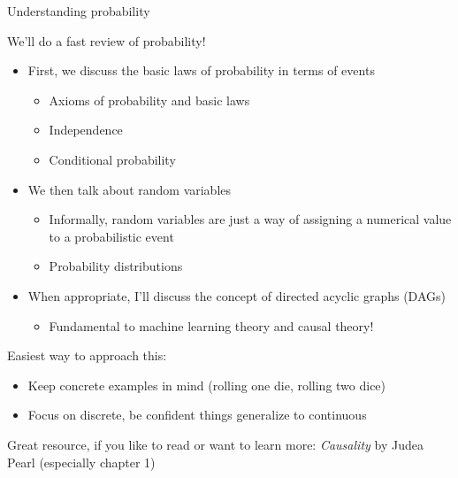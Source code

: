 \documentclass[compress, 8pt]{beamer}
\begin{document}
\begin{frame}{Understanding probability}

We'll do a fast review of probability!
\begin{itemize}
    \item First, we discuss the basic laws of probability in terms of events
    \begin{itemize}
        \item Axioms of probability and basic laws
        \item Independence
        \item Conditional probability
    \end{itemize}
    \item We then talk about random variables
    \begin{itemize}
        \item Informally, random variables are just a way of assigning a numerical value to a probabilistic event
        \item Probability distributions
    \end{itemize}
    \item When appropriate, I'll discuss the concept of directed acyclic graphs (DAGs)
    \begin{itemize}
        \item Fundamental to machine learning theory and causal theory!

    \end{itemize}

\end{itemize}

Easiest way to approach this:
\begin{itemize}
    \item Keep concrete examples in mind (rolling one die, rolling two dice)
    \item Focus on discrete, be confident things generalize to continuous
\end{itemize}


Great resource, if you like to read or want to learn more: \emph{Causality} by Judea Pearl (especially chapter 1)

\end{frame}
    

\end{document}
